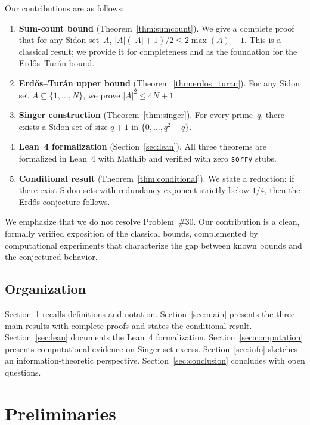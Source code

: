 \documentclass[11pt]{amsart}
\theoremstyle{plain}
\theoremstyle{definition}
\theoremstyle{remark}
\begin{document}
Our contributions are as follows:
\begin{enumerate}
\item \textbf{Sum-count bound} (Theorem~\ref{thm:sumcount}).
  We give a complete proof that for any Sidon set~$A$,
  $|A|(|A|+1)/2 \le 2\max(A) + 1$.
  This is a classical result; we provide it for completeness and as the
  foundation for the Erd\H{o}s--Tur\'an bound.

\item \textbf{Erd\H{o}s--Tur\'an upper bound}
  (Theorem~\ref{thm:erdos_turan}).
  For any Sidon set $A \subseteq \{1,\dots,N\}$,
  we prove $|A|^2 \le 4N + 1$.

\item \textbf{Singer construction} (Theorem~\ref{thm:singer}).
  For every prime~$q$, there exists a Sidon set of size $q+1$
  in $\{0,\dots,q^2+q\}$.

\item \textbf{Lean~4 formalization} (Section~\ref{sec:lean}).
  All three theorems are formalized in Lean~4 with Mathlib
  and verified with zero \texttt{sorry} stubs.

\item \textbf{Conditional result} (Theorem~\ref{thm:conditional}).
  We state a reduction: if there exist Sidon sets with redundancy
  exponent strictly below $1/4$, then the Erd\H{o}s conjecture
  follows.
\end{enumerate}

We emphasize that we do not resolve Problem~\#30.
Our contribution is a clean, formally verified exposition of the
classical bounds, complemented by computational experiments that
characterize the gap between known bounds and the conjectured behavior.

\subsection{Organization}

Section~\ref{sec:prelim} recalls definitions and notation.
Section~\ref{sec:main} presents the three main results with complete
proofs and states the conditional result.
Section~\ref{sec:lean} documents the Lean~4 formalization.
Section~\ref{sec:computation} presents computational evidence on
Singer set excess.
Section~\ref{sec:info} sketches an information-theoretic perspective.
Section~\ref{sec:conclusion} concludes with open questions.

\section{Preliminaries}\label{sec:prelim}
\end{document}
